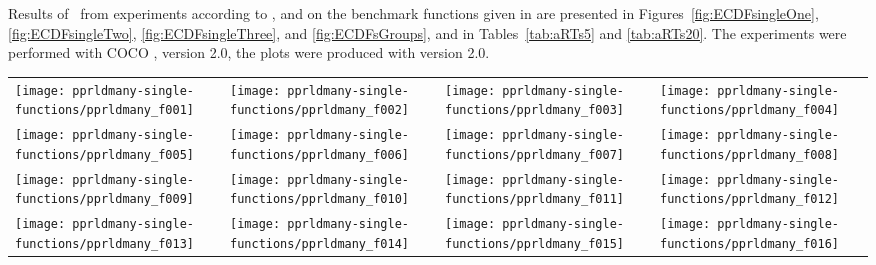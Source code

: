 \documentclass[sigconf]{acmart}
\newcommand{\change}[1]{{\color{red} #1}}
\begin{document}
Results of \algname\ from experiments according to \cite{hansen2016exp}, \cite{hansen2016perfass} and \cite{biobj2016perfass} on the benchmark
functions given in \cite{biobj2016func} are presented in
Figures~\ref{fig:ECDFsingleOne}, \ref{fig:ECDFsingleTwo}, \ref{fig:ECDFsingleThree}, and \ref{fig:ECDFsGroups}, and in
Tables~\ref{tab:aRTs5} and \ref{tab:aRTs20}. The experiments were performed with COCO \cite{hansen2016cocoplat}, version \change{2.0}, the plots were produced with version \change{2.0}.



\begin{figure*}
\centering
\begin{tabular}{@{\hspace*{-0.018\textwidth}}l@{\hspace*{-0.02\textwidth}}l@{\hspace*{-0.02\textwidth}}l@{\hspace*{-0.02\textwidth}}l@{\hspace*{-0.02\textwidth}}}
\texttt{[image: pprldmany-single-functions/pprldmany\_f001]}&
\texttt{[image: pprldmany-single-functions/pprldmany\_f002]}&
\texttt{[image: pprldmany-single-functions/pprldmany\_f003]}&
\texttt{[image: pprldmany-single-functions/pprldmany\_f004]}\\
\texttt{[image: pprldmany-single-functions/pprldmany\_f005]}&
\texttt{[image: pprldmany-single-functions/pprldmany\_f006]}&
\texttt{[image: pprldmany-single-functions/pprldmany\_f007]}&
\texttt{[image: pprldmany-single-functions/pprldmany\_f008]}\\
\texttt{[image: pprldmany-single-functions/pprldmany\_f009]}&
\texttt{[image: pprldmany-single-functions/pprldmany\_f010]}&
\texttt{[image: pprldmany-single-functions/pprldmany\_f011]}&
\texttt{[image: pprldmany-single-functions/pprldmany\_f012]}\\
\texttt{[image: pprldmany-single-functions/pprldmany\_f013]}&
\texttt{[image: pprldmany-single-functions/pprldmany\_f014]}&
\texttt{[image: pprldmany-single-functions/pprldmany\_f015]}&
\texttt{[image: pprldmany-single-functions/pprldmany\_f016]}\\[-1.8ex]
\end{tabular}
 \caption{\label{fig:ECDFsingleOne}
}

\end{figure*}
\end{document}
